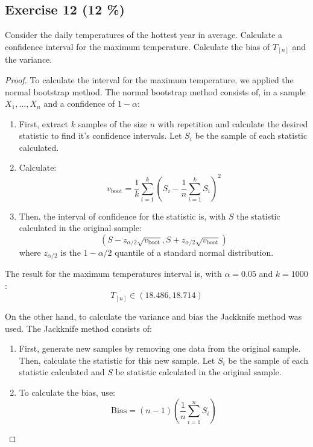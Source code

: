 \documentclass[11pt]{article}
\theoremstyle{definition}
\theoremstyle{remark}
\theoremstyle{remark}
\begin{document}
\subsection*{Exercise 12 (12 \%)}
Consider the daily temperatures of the hottest year in
average. Calculate a confidence interval for the maximum
temperature. Calculate the bias of $T_{[n]}$ and the variance.

\begin{proof}
  To calculate the interval for the maximum temperature, we applied
  the normal bootstrap method. The normal bootstrap method consists
  of, in a sample $X_1, \ldots, X_n$ and a confidence of $1 - \alpha$:
  \begin{enumerate}
  \item First, extract $k$ samples of the size $n$ with repetition and
    calculate the desired statistic to find it's confidence
    intervals.  Let $S_i$ be the sample of each statistic calculated.
  \item Calculate:
    \begin{equation*}
      v_{\text{boot}} = \frac{1}{k} \sum_{i=1}^k\left(S_i - \frac{1}{n}
        \sum_{i=1}^k S_i\right)^2
     \end{equation*}
   \item Then, the interval of confidence for the statistic is, with
     $S$ the statistic calculated in the original sample:
     \begin{equation*}
       (S - z_{\alpha/2} \sqrt{v_{\text{boot}}} , S + z_{\alpha/2} \sqrt{v_{\text{boot}}})
     \end{equation*}
     where $z_{\alpha/2}$ is the $1 - \alpha / 2$ quantile of a
     standard normal distribution.
   \end{enumerate}
   The result for the maximum temperatures interval is, with
   $\alpha=0.05$ and $k = 1000$:
   \begin{equation*}
     T_{[n]} \in (18.486, 18.714)
   \end{equation*}

   On the other hand, to calculate the variance and bias the Jackknife
   method was used. The Jackknife method consists of:
   \begin{enumerate}
   \item First, generate new samples by removing one data from the
     original sample. Then, calculate the statistic for this new
     sample. Let $S_i$ be the sample of each statistic calculated and
     $S$ be statistic calculated in the original sample.
   \item To calculate the bias, use:
     \begin{equation*}
       \text{Bias} = (n - 1) \left(\frac{1}{n} \sum_{i=1}^n S_i \right)
     \end{equation*}
   \end{enumerate}
\end{proof}
\end{document}
